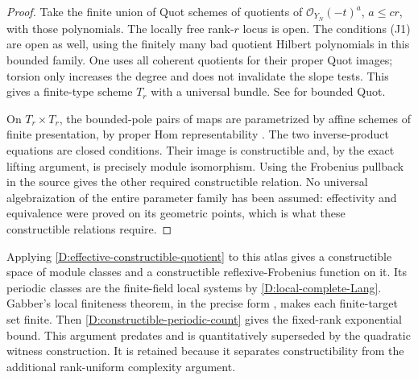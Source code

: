 \begin{proof}
Take the finite union of Quot schemes of quotients of
\(\mathcal O_{Y_N}(-t)^a\), \(a\leq cr\), with those polynomials.
The locally free rank-\(r\) locus is open.
The conditions (J1) are open as well, using the finitely many
bad quotient Hilbert polynomials in this bounded family.
One uses all coherent quotients for their proper Quot images;
torsion only increases the degree and does not invalidate
the slope tests. This gives a finite-type scheme \(T_r\) with
a universal bundle. See \cite[Tag 0DPA]{StacksLocalAtlasB} for
bounded Quot.

On \(T_r\times T_r\), the bounded-pole pairs of maps are
parametrized by affine schemes of finite presentation, by
proper Hom representability
\cite[Tag 08K6]{StacksLocalAtlasB}.
The two inverse-product equations are closed conditions.
Their image is constructible and, by the exact lifting argument,
is precisely module isomorphism. Using the Frobenius pullback
in the source gives the other required constructible relation.
No universal algebraization of the entire parameter family
has been assumed: effectivity and equivalence were proved
on its geometric points, which is what these constructible
relations require.
\end{proof}

\begin{remark}
Applying \ref{D:effective-constructible-quotient} to this atlas
gives a constructible space of module classes and a constructible
reflexive-Frobenius function on it. Its periodic classes are
the finite-field local systems by
\ref{D:local-complete-Lang}.
Gabber's local finiteness theorem, in the precise form
\cite[Theorem 1.4]{DegliseGabber2007LocalB}, makes each finite-target
set finite. Then \ref{D:constructible-periodic-count} gives the
fixed-rank exponential bound. This argument predates and is
quantitatively superseded by the quadratic witness construction.
It is retained because it separates constructibility from the
additional rank-uniform complexity argument.
\end{remark}

